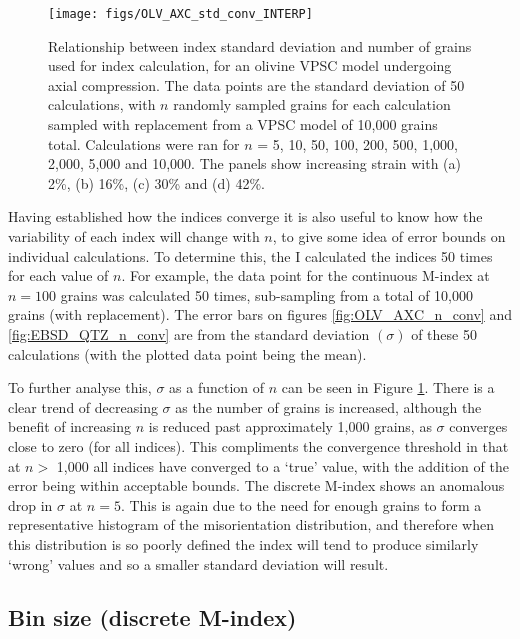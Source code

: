 \documentclass[a4paper,12pt,twoside]{report}
\numberwithin{equation}{chapter}
\begin{document}
      
\begin{figure}[h!]
  \centering
    \texttt{[image: figs/OLV\_AXC\_std\_conv\_INTERP]}
  \caption[Index error with no. grains (olivine)]{Relationship between index standard deviation and number of grains used for index calculation, for an olivine VPSC model undergoing axial compression. The data points are the standard deviation of 50 calculations, with $n$ randomly sampled grains for each calculation sampled with replacement from a VPSC model of 10,000 grains total. Calculations were ran for $n$ = 5, 10, 50, 100, 200, 500, 1,000, 2,000, 5,000 and 10,000. The panels show increasing strain with (a) 2\%, (b) 16\%, (c) 30\% and (d) 42\%.}
  \label{fig:OLV_AXC_n_conv_err}
\end{figure}


Having established how the indices converge it is also useful to know how the variability of each index will change with $n$, to give some idea of error bounds on individual calculations. To determine this, the I calculated the indices 50 times for each value of $n$. For example, the data point for the continuous M-index at $n = 100$ grains was calculated 50 times, sub-sampling from a total of 10,000 grains (with replacement). The error bars on figures \ref{fig:OLV_AXC_n_conv} and \ref{fig:EBSD_QTZ_n_conv} are from the standard deviation $(\sigma)$ of these 50 calculations (with the plotted data point being the mean).

To further analyse this, $\sigma$ as a function of $n$ can be seen in Figure \ref{fig:OLV_AXC_n_conv_err}. There is a clear trend of decreasing $\sigma$ as the number of grains is increased, although the benefit of increasing $n$ is reduced past approximately 1,000 grains, as $\sigma$ converges close to zero (for all indices). This compliments the convergence threshold in that at $n >$ 1,000 all indices have converged to a \lq{}true\rq{} value, with the addition of the error being within acceptable bounds. The discrete M-index shows an anomalous drop in $\sigma$ at $n = 5$. This is again due to the need for enough grains to form a representative histogram of the misorientation distribution, and therefore when this distribution is so poorly defined the index will tend to produce similarly \lq{}wrong\rq{} values and so a smaller standard deviation will result.

\subsection{Bin size (discrete M-index)} \label{sec:bin_size}
\end{document}
